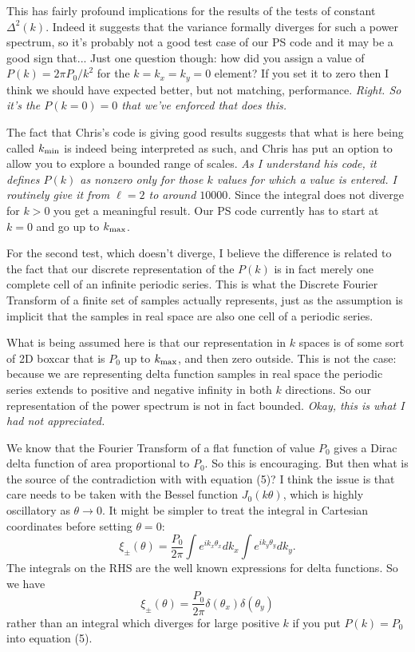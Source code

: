 \documentclass[preprint]{aastex}
\begin{document}
This has fairly profound implications for the results of the tests of constant
$\Delta^2(k)$.  Indeed it suggests that the variance formally diverges for such
a power spectrum, so it's probably not a good test case of our PS
code and it may be a good sign that...  Just one question though: how did you assign a value of $P(k) = 2 \pi
P_0/ k^2$ for the $k = k_x = k_y = 0$ element?  If you set it to zero
then I think we should have expected better, but not matching,
performance.  {\em Right.  So it's the $P(k=0)=0$ that we've enforced
  that does this.}

The fact that Chris's code is giving good results suggests that what
is here being called $k_{\rm min}$ is indeed being interpreted as
such, and Chris has put an option to allow you to explore a bounded
range of scales.  {\em As I understand his code, it defines $P(k)$ as
  nonzero only for those $k$ values for which a value is entered.  I
  routinely give it from $\ell=2$ to around $10000$.}  Since the integral does not diverge for $k > 0$ you get a
meaningful result.  Our PS code currently has to start at $k=0$ and go
up to $k_{\rm max}$.

For the second test, which doesn't diverge, 
I believe the difference is related to the fact that our discrete
representation of the $P(k)$ is in fact merely one complete cell of an infinite
periodic series. This is what the Discrete Fourier Transform of a
finite set of samples actually represents, just as the assumption is
implicit that the samples in real space are also one cell of a
periodic series.

What is being assumed here is that our representation in $k$ spaces is
of some sort of 2D boxcar that is $P_0$ up to $k_{\rm max}$, and then
zero outside.  This is not the case: because we are representing delta
function samples in real space the periodic series extends to positive
and negative infinity in both $k$ directions.  So our representation
of the power spectrum is not in fact bounded.  {\em Okay, this is what
  I had not appreciated.}

We know that the Fourier Transform of a flat function of value $P_0$ gives a Dirac delta
function of area proportional to $P_0$.  So this is encouraging.  But
then what is the source of the contradiction with with equation (5)?  I think the issue is that
care needs to be taken with the Bessel function $J_0(k \theta)$, which
is highly oscillatory as $\theta \rightarrow 0$.  It might be simpler
to treat the integral in Cartesian coordinates before setting $\theta=0$:
\begin{equation}
\xi_{\pm}(\theta) = \frac{P_0}{2 \pi} \int \! e^{ik_x \theta_x} dk_x
\int \! e^{i k_y \theta_y} dk_y.
\end{equation}
The integrals on the RHS are the well known expressions for delta
functions.  So we have
\begin{equation}
\xi_{\pm}(\theta) = \frac{P_0}{2 \pi} \delta(\theta_x) \delta(\theta_y)
\end{equation}
rather than an integral which diverges for large positive $k$ if you
put $P(k) = P_0$ into equation (5).
\end{document}

